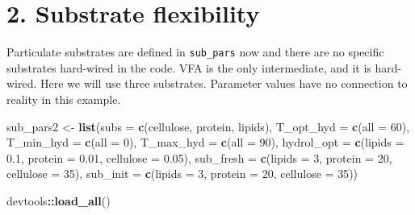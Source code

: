 \documentclass[
]{article}
\newenvironment{Shaded}{\begin{snugshade}}{\end{snugshade}}
\newcommand{\AttributeTok}[1]{\textcolor[rgb]{0.13,0.29,0.53}{#1}}
\newcommand{\DecValTok}[1]{\textcolor[rgb]{0.00,0.00,0.81}{#1}}
\newcommand{\FloatTok}[1]{\textcolor[rgb]{0.00,0.00,0.81}{#1}}
\newcommand{\FunctionTok}[1]{\textcolor[rgb]{0.13,0.29,0.53}{\textbf{#1}}}
\newcommand{\NormalTok}[1]{#1}
\newcommand{\OtherTok}[1]{\textcolor[rgb]{0.56,0.35,0.01}{#1}}
\newcommand{\SpecialCharTok}[1]{\textcolor[rgb]{0.81,0.36,0.00}{\textbf{#1}}}
\newcommand{\StringTok}[1]{\textcolor[rgb]{0.31,0.60,0.02}{#1}}
\begin{document}
\hypertarget{substrate-flexibility}{%
\section{2. Substrate flexibility}\label{substrate-flexibility}}

Particulate substrates are defined in \texttt{sub\_pars} now and there
are no specific substrates hard-wired in the code. VFA is the only
intermediate, and it is hard-wired. Here we will use three substrates.
Parameter values have no connection to reality in this example.

\begin{Shaded}
\begin{Highlighting}[]
\NormalTok{sub\_pars2 }\OtherTok{\textless{}{-}} \FunctionTok{list}\NormalTok{(}\AttributeTok{subs =} \FunctionTok{c}\NormalTok{(}\StringTok{\textquotesingle{}cellulose\textquotesingle{}}\NormalTok{, }\StringTok{\textquotesingle{}protein\textquotesingle{}}\NormalTok{, }\StringTok{\textquotesingle{}lipids\textquotesingle{}}\NormalTok{),}
                  \AttributeTok{T\_opt\_hyd =} \FunctionTok{c}\NormalTok{(}\AttributeTok{all =} \DecValTok{60}\NormalTok{),}
                  \AttributeTok{T\_min\_hyd =} \FunctionTok{c}\NormalTok{(}\AttributeTok{all =} \DecValTok{0}\NormalTok{),}
                  \AttributeTok{T\_max\_hyd =} \FunctionTok{c}\NormalTok{(}\AttributeTok{all =} \DecValTok{90}\NormalTok{),}
                  \AttributeTok{hydrol\_opt =} \FunctionTok{c}\NormalTok{(}\AttributeTok{lipids =} \FloatTok{0.1}\NormalTok{, }\AttributeTok{protein =} \FloatTok{0.01}\NormalTok{, }\AttributeTok{cellulose =} \FloatTok{0.05}\NormalTok{),}
                  \AttributeTok{sub\_fresh =} \FunctionTok{c}\NormalTok{(}\AttributeTok{lipids =} \DecValTok{3}\NormalTok{, }\AttributeTok{protein =} \DecValTok{20}\NormalTok{, }\AttributeTok{cellulose =} \DecValTok{35}\NormalTok{),}
                  \AttributeTok{sub\_init =} \FunctionTok{c}\NormalTok{(}\AttributeTok{lipids =} \DecValTok{3}\NormalTok{, }\AttributeTok{protein =} \DecValTok{20}\NormalTok{, }\AttributeTok{cellulose =} \DecValTok{35}\NormalTok{))}
\end{Highlighting}
\end{Shaded}

\begin{Shaded}
\begin{Highlighting}[]
\NormalTok{devtools}\SpecialCharTok{::}\FunctionTok{load\_all}\NormalTok{()}
\end{Highlighting}
\end{Shaded}
\end{document}

